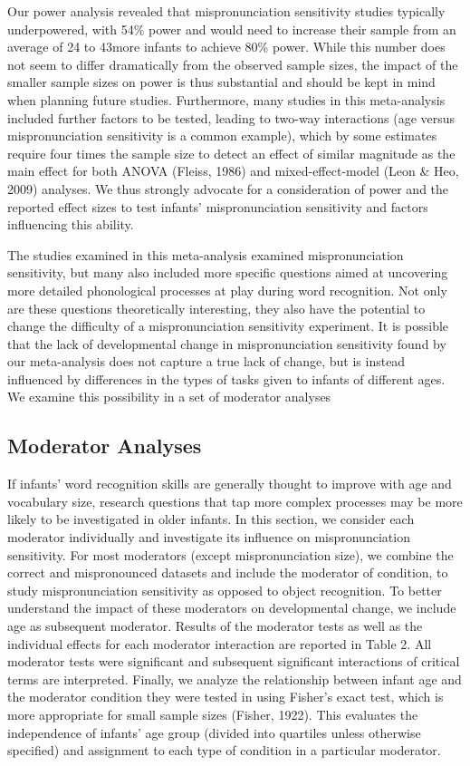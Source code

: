 \documentclass[man, noextraspace]{apa6}
\begin{document}
Our power analysis revealed that mispronunciation sensitivity studies typically underpowered, with 54\% power and would need to increase their sample from an average of 24 to 43more infants to achieve 80\% power. While this number does not seem to differ dramatically from the observed sample sizes, the impact of the smaller sample sizes on power is thus substantial and should be kept in mind when planning future studies. Furthermore, many studies in this meta-analysis included further factors to be tested, leading to two-way interactions (age versus mispronunciation sensitivity is a common example), which by some estimates require four times the sample size to detect an effect of similar magnitude as the main effect for both ANOVA (Fleiss, 1986) and mixed-effect-model (Leon \& Heo, 2009) analyses. We thus strongly advocate for a consideration of power and the reported effect sizes to test infants' mispronunciation sensitivity and factors influencing this ability.

The studies examined in this meta-analysis examined mispronunciation sensitivity, but many also included more specific questions aimed at uncovering more detailed phonological processes at play during word recognition. Not only are these questions theoretically interesting, they also have the potential to change the difficulty of a mispronunciation sensitivity experiment. It is possible that the lack of developmental change in mispronunciation sensitivity found by our meta-analysis does not capture a true lack of change, but is instead influenced by differences in the types of tasks given to infants of different ages. We examine this possibility in a set of moderator analyses

\hypertarget{moderator-analyses}{%
\subsection{Moderator Analyses}\label{moderator-analyses}}

If infants' word recognition skills are generally thought to improve with age and vocabulary size, research questions that tap more complex processes may be more likely to be investigated in older infants. In this section, we consider each moderator individually and investigate its influence on mispronunciation sensitivity. For most moderators (except mispronunciation size), we combine the correct and mispronounced datasets and include the moderator of condition, to study mispronunciation sensitivity as opposed to object recognition. To better understand the impact of these moderators on developmental change, we include age as subsequent moderator. Results of the moderator tests as well as the individual effects for each moderator interaction are reported in Table 2. All moderator tests were significant and subsequent significant interactions of critical terms are interpreted. Finally, we analyze the relationship between infant age and the moderator condition they were tested in using Fisher's exact test, which is more appropriate for small sample sizes (Fisher, 1922). This evaluates the independence of infants' age group (divided into quartiles unless otherwise specified) and assignment to each type of condition in a particular moderator.
\end{document}
